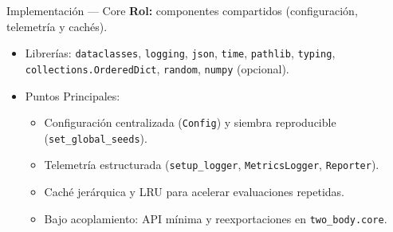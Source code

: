 \begin{frame}{Implementación — Core}
    \textbf{Rol:} componentes compartidos (configuración, telemetría y cachés).
    \vspace{0.2cm}
    \begin{itemize}
        \item Librerías: \texttt{dataclasses}, \texttt{logging}, \texttt{json}, \texttt{time}, \texttt{pathlib}, \texttt{typing}, \texttt{collections.OrderedDict}, \texttt{random}, \texttt{numpy} (opcional).
        \item Puntos Principales:
        \begin{itemize}
            \item Configuración centralizada (\texttt{Config}) y siembra reproducible (\texttt{set\_global\_seeds}).
            \item Telemetría estructurada (\texttt{setup\_logger}, \texttt{MetricsLogger}, \texttt{Reporter}).
            \item Caché jerárquica y LRU para acelerar evaluaciones repetidas.
            \item Bajo acoplamiento: API mínima y reexportaciones en \texttt{two\_body.core}.
        \end{itemize}
    \end{itemize}
\end{frame}


